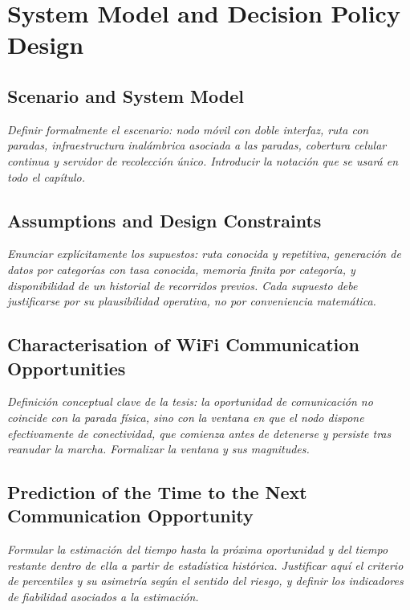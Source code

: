 \chapter{System Model and Decision Policy Design}


\section{Scenario and System Model}
\emph{Definir formalmente el escenario: nodo móvil con doble interfaz, ruta con
paradas, infraestructura inalámbrica asociada a las paradas, cobertura celular
continua y servidor de recolección único. Introducir la notación que se usará en
todo el capítulo.}

\section{Assumptions and Design Constraints}
\emph{Enunciar explícitamente los supuestos: ruta conocida y repetitiva,
generación de datos por categorías con tasa conocida, memoria finita por
categoría, y disponibilidad de un historial de recorridos previos. Cada supuesto
debe justificarse por su plausibilidad operativa, no por conveniencia
matemática.}

\section{Characterisation of WiFi Communication Opportunities}
\emph{Definición conceptual clave de la tesis: la oportunidad de comunicación no
coincide con la parada física, sino con la ventana en que el nodo dispone
efectivamente de conectividad, que comienza antes de detenerse y persiste tras
reanudar la marcha. Formalizar la ventana y sus magnitudes.}

\section{Prediction of the Time to the Next Communication Opportunity}
\emph{Formular la estimación del tiempo hasta la próxima oportunidad y del tiempo
restante dentro de ella a partir de estadística histórica. Justificar aquí el
criterio de percentiles y su asimetría según el sentido del riesgo, y definir los
indicadores de fiabilidad asociados a la estimación.}

